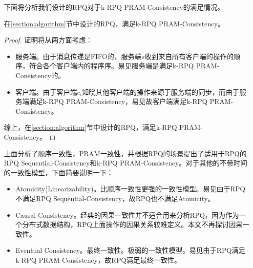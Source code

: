 			\par 下面将分析我们设计的RPQ对于k-RPQ PRAM-Consistency的满足情况。
			\begin{theorem}
				在\ref{section:algorithm}节中设计的RPQ，满足k-RPQ PRAM-Consistency。
			\end{theorem}
			\begin{proof}
				证明将从两方面考虑：
				\begin{itemize}
					\item 服务端。由于消息传递是FIFO的，服务端$s$收到来自所有客户端的操作的顺序，符合各个客户端内的程序序。易见服务端是满足k-RPQ PRAM-Consistency的。
					\item 客户端。由于客户端$c_i$知晓其他客户端的操作来源于服务端的同步，而由于服务端满足k-RPQ PRAM-Consistency，易见故客户端满足k-RPQ PRAM-Consistency。
				\end{itemize}
				综上，在\ref{section:algorithm}节中设计的RPQ，满足k-RPQ PRAM-Consistency。
			\end{proof}
		\par 上面分析了顺序一致性，PRAM一致性，并根据RPQ的场景提出了适用于RPQ的RPQ Sequential-Consistency和k-RPQ PRAM-Consistency。对于其他的不带时间的一致性模型，下面简要说明一下：
		\begin{itemize}
			\item Atomicity(Linearizability)\cite{herlihy1990linearizability}。比顺序一致性更强的一致性模型\cite{Attiya:1994:SCV:176575.176576}。易见由于RPQ不满足RPQ Sequential-Consistency，故RPQ也不满足Atomicity。
			\item Causal Consistency\cite{ahamad1995causal}。经典的因果一致性并不适合用来分析RPQ，因为作为一个分布式数据结构，RPQ上面操作的因果关系较难定义。本文不再探讨因果一致性。
			\item Eventual Consistency\cite{vogels2009eventually}。最终一致性。极弱的一致性模型。易见由于RPQ满足k-RPQ PRAM-Consistency，故RPQ满足最终一致性。
		\end{itemize}
